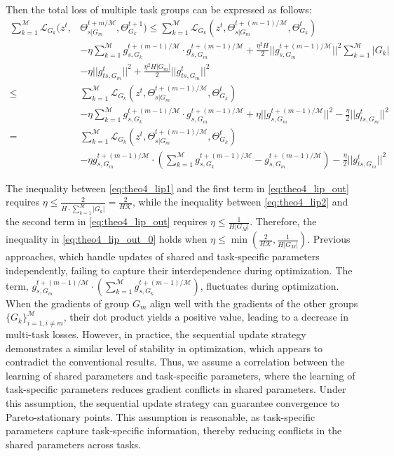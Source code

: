 Then the total loss of multiple task groups can be expressed as follows:
\begin{align}
    \sum_{k=1}^{\mathcal{M}} \mathcal{L}_{G_k}(z^t, &\Theta_{s|G_m}^{t+m/\mathcal{M}}, \Theta_{G_k}^{t+1}) \leq \sum_{k=1}^{\mathcal{M}} \mathcal{L}_{G_k}(z^t, \Theta_{s|G_m}^{t+(m-1)/\mathcal{M}}, \Theta_{G_k}^t) \\
    &-\eta\sum_{k=1}^{\mathcal{M}} g_{s, G_k}^{t+(m-1)/\mathcal{M}} \cdot g_{s, G_m}^{t+(m-1)/\mathcal{M}} + \frac{\eta^2 H}{2} ||g_{s, G_m}^{t+(m-1)/\mathcal{M}}||^2 \sum_{k=1}^{\mathcal{M}} |G_k| \label{eq:theo4_lip1}\\ 
    &- \eta ||g_{ts, G_m}^t||^2  + \frac{\eta^2 H|G_m|}{2}||g_{ts, G_m}^t||^2 \label{eq:theo4_lip2}\\
    \leq&\sum_{k=1}^{\mathcal{M}} \mathcal{L}_{G_k}(z^t, \Theta_{s|G_m}^{t+(m-1)/\mathcal{M}}, \Theta_{G_k}^t) \label{eq:theo4_lip_out_0}\\
    &-\eta\sum_{k=1}^{\mathcal{M}} g_{s, G_k}^{t+(m-1)/\mathcal{M}} \cdot g_{s, G_m}^{t+(m-1)/\mathcal{M}} + \eta ||g_{s, G_m}^{t+(m-1)/\mathcal{M}}||^2 - \frac{\eta}{2}||g_{ts, G_m}^t||^2 \label{eq:theo4_lip_out}\\
    =& \sum_{k=1}^{\mathcal{M}} \mathcal{L}_{G_k}(z^t, \Theta_{s|G_m}^{t+(m-1)/\mathcal{M}}, \Theta_{G_k}^t)\\
    &-\eta g_{s, G_m}^{t+(m-1)/\mathcal{M}} \cdot (\sum_{k=1}^{\mathcal{M}} g_{s, G_k}^{t+(m-1)/\mathcal{M}} - g_{s, G_m}^{t+(m-1)/\mathcal{M}}) - \frac{\eta}{2}||g_{ts, G_m}^t||^2
    \label{eq:theo4_result}
\end{align}


The inequality between \cref{eq:theo4_lip1} and the first term in \cref{eq:theo4_lip_out} requires $\eta\leq \frac{2}{H\cdot \sum_{k=1}^{\mathcal{M}} |G_k|} = \frac{2}{H \mathcal{K}}$, while the inequality between \cref{eq:theo4_lip2} and the second term in \cref{eq:theo4_lip_out} requires $\eta\leq \frac{1}{H|G_M|}$. Therefore, the inequality in \cref{eq:theo4_lip_out_0} holds when $\eta \leq \min(\frac{2}{H\mathcal{K}}, \frac{1}{H|G_M|})$. Previous approaches, which handle updates of shared and task-specific parameters independently, failing to capture their interdependence during optimization.
The term, $g_{s, G_m}^{t+(m-1)/\mathcal{M}} \cdot (\sum_{k=1}^{\mathcal{M}} g_{s, G_k}^{t+(m-1)/\mathcal{M}})$, fluctuates during optimization. When the gradients of group $G_m$ align well with the gradients of the other groups $\{G_k\}_{i=1, i\neq m}^{\mathcal{M}}$, their dot product yields a positive value, leading to a decrease in multi-task losses. However, in practice, the sequential update strategy demonstrates a similar level of stability in optimization, which appears to contradict the conventional results. Thus, we assume a correlation between the learning of shared parameters and task-specific parameters, where the learning of task-specific parameters reduces gradient conflicts in shared parameters. Under this assumption, the sequential update strategy can guarantee convergence to Pareto-stationary points. This assumption is reasonable, as task-specific parameters capture task-specific information, thereby reducing conflicts in the shared parameters across tasks.
 

